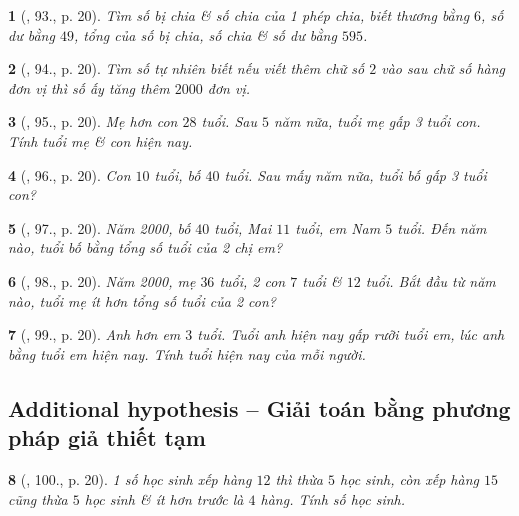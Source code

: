 \documentclass{article}
\newtheorem{baitoan}{}
\begin{document}
\begin{baitoan}[\cite{Binh_Toan_6_tap_1}, 93., p. 20]
	Tìm số bị chia \& số chia của 1 phép chia, biết thương bằng $6$, số dư bằng $49$, tổng của số bị chia, số chia \& số dư bằng $595$.
\end{baitoan}

\begin{baitoan}[\cite{Binh_Toan_6_tap_1}, 94., p. 20]
	Tìm số tự nhiên biết nếu viết thêm chữ số $2$ vào sau chữ số hàng đơn vị thì số ấy tăng thêm $2000$ đơn vị.
\end{baitoan}

\begin{baitoan}[\cite{Binh_Toan_6_tap_1}, 95., p. 20]
	Mẹ hơn con $28$ tuổi. Sau $5$ năm nữa, tuổi mẹ gấp 3 tuổi con. Tính tuổi mẹ \& con hiện nay.
\end{baitoan}

\begin{baitoan}[\cite{Binh_Toan_6_tap_1}, 96., p. 20]
	Con $10$ tuổi, bố $40$ tuổi. Sau mấy năm nữa, tuổi bố gấp 3 tuổi con?
\end{baitoan}

\begin{baitoan}[\cite{Binh_Toan_6_tap_1}, 97., p. 20]
	Năm 2000, bố $40$ tuổi, Mai $11$ tuổi, em Nam $5$ tuổi. Đến năm nào, tuổi bố bằng tổng số tuổi của 2 chị em?
\end{baitoan}

\begin{baitoan}[\cite{Binh_Toan_6_tap_1}, 98., p. 20]
	Năm 2000, mẹ $36$ tuổi, 2 con $7$ tuổi \& $12$ tuổi. Bắt đầu từ năm nào, tuổi mẹ ít hơn tổng số tuổi của 2 con?
\end{baitoan}

\begin{baitoan}[\cite{Binh_Toan_6_tap_1}, 99., p. 20]
	Anh hơn em $3$ tuổi. Tuổi anh hiện nay gấp rưỡi tuổi em, lúc anh bằng tuổi em hiện nay. Tính tuổi hiện nay của mỗi người.
\end{baitoan}

\subsection{Additional hypothesis -- Giải toán bằng phương pháp giả thiết tạm}

\begin{baitoan}[\cite{Binh_Toan_6_tap_1}, 100., p. 20]
	1 số học sinh xếp hàng $12$ thì thừa $5$ học sinh, còn xếp hàng $15$ cũng thừa $5$ học sinh \& ít hơn trước là $4$ hàng. Tính số học sinh.
\end{baitoan}
\end{document}
